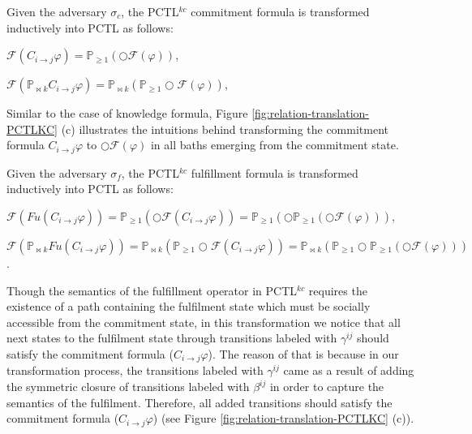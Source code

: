 Given the adversary $\sigma_c$, the PCTL$^{kc}$ commitment formula is
transformed inductively into PCTL as follows:

$\mathscr{F}(C_{i\rightarrow j}\varphi)= \mathbb{P}_{\geq 1}(\bigcirc \mathscr{F}(\varphi))$,

$\mathscr{F}(\mathbb{P}_{\bowtie k} C_{i\rightarrow j}\varphi)= \mathbb{P}_{\bowtie k}(\mathbb{P}_{\geq 1}\bigcirc\mathscr{F}(\varphi))$,

Similar to the case of knowledge formula, Figure \ref{fig:relation-translation-PCTLKC} (c) illustrates the intuitions behind transforming the commitment formula $C_{i\rightarrow j}\varphi$ to  $\bigcirc \mathscr{F}(\varphi)$ in all baths emerging from the commitment state.

Given the adversary $\sigma_f$, the PCTL$^{kc}$ fulfillment formula
is transformed inductively into PCTL as follows:

$\mathscr{F}(Fu(C_{i\rightarrow j}\varphi))= \mathbb{P}_{\geq 1}(\bigcirc \mathscr{F}(C_{i\rightarrow j}\varphi))= \mathbb{P}_{\geq 1}(\bigcirc\mathbb{P}_{\geq 1}(\bigcirc \mathscr{F}(\varphi)))$,

$\mathscr{F}(\mathbb{P}_{\bowtie k} Fu(C_{i\rightarrow j}\varphi))= \mathbb{P}_{\bowtie k} (\mathbb{P}_{\geq 1}\bigcirc\mathscr{F}(C_{i\rightarrow j}\varphi))= \mathbb{P}_{\bowtie k}(\mathbb{P}_{\geq 1}\bigcirc\mathbb{P}_{\geq 1}(\bigcirc \mathscr{F}(\varphi)))$.

Though the semantics of the fulfillment operator in PCTL$^{kc}$ requires the existence of a path containing the fulfilment state which must be socially accessible from the commitment state, in this transformation we notice that all next states to the fulfilment state through transitions labeled with $\gamma^{ij}$ should satisfy the commitment formula ($C_{i\rightarrow j}\varphi$). The reason of that is because in our transformation process, the transitions labeled with $\gamma^{ij}$ came as a result of adding the symmetric closure of transitions labeled with $\beta^{ij}$ in order to capture the semantics of the fulfilment. Therefore, all added transitions should satisfy the commitment formula ($C_{i\rightarrow j}\varphi$) (see Figure \ref{fig:relation-translation-PCTLKC} (c)).


